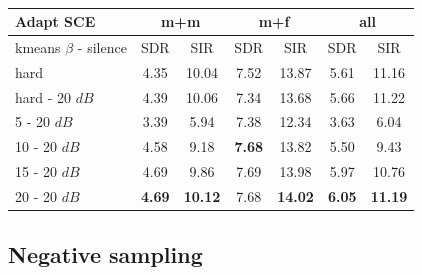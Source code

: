 \documentclass[master, tikz, final,11pt, dvipdfmx]{iscs-thesis}
\begin{document}
\begin{table}[h]
\centering
\begin{tabular}{l|c|c|c|c|c|c}
Adapt SCE & \multicolumn{2}{c|}{m+m} & \multicolumn{2}{c|}{m+f} & \multicolumn{2}{c}{all} \\ 
\hline 
kmeans $\beta$ - silence & SDR & SIR & SDR & SIR & SDR & SIR \\ 
\hline
hard   & 4.35 & 10.04 & 7.52 & 13.87 & 5.61 & 11.16 \\ 
hard - 20 $dB$  & 4.39 & 10.06 & 7.34 & 13.68 & 5.66 & 11.22 \\
\hline
\hline
5 - 20 $dB$  & 3.39 & 5.94 & 7.38 & 12.34 & 3.63 & 6.04 \\ 
10 - 20 $dB$  & 4.58 & 9.18 & \cellcolor{green}\textbf{7.68} & \cellcolor{green}13.82 & 5.50 & 9.43 \\ 
15 - 20 $dB$ & 4.69 & 9.86 & 7.69 & 13.98 & 5.97 & 10.76 \\ 
20 - 20 $dB$ & \cellcolor{green}\textbf{4.69} & \cellcolor{green}\textbf{10.12} & 7.68 & \textbf{14.02} & \cellcolor{green}\textbf{6.05} & \cellcolor{green}\textbf{11.19} \\ 
\end{tabular}
\captionsetup{justification=centering}
\caption{}
\label{table:AdaptSCE100}
\end{table}

\subsection{Negative sampling}
\label{NS}

\lipsum[1]
\end{document}
